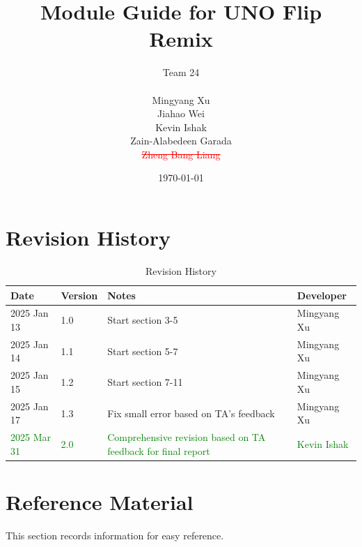 \documentclass[12pt, titlepage]{article}
\newcommand{\progname}{UNO Flip Remix}
\newcommand{\removed}[1]{\textcolor{red}{\sout{#1}}}
\newcommand{\added}[1]{\textcolor{green}{#1}}
\begin{document}
\title{Module Guide for \progname} 

\author{
\begin{tabular}{c}
Team 24\\
\\
Mingyang Xu \\
Jiahao Wei \\
Kevin Ishak \\
Zain-Alabedeen Garada \\
\removed{Zheng Bang Liang} \\
\end{tabular}
}

\date{\today}

\maketitle


\section{Revision History}

\begin{table}[H]
\centering
\begin{tabularx}{\textwidth}{p{3cm}p{2cm}p{6cm}p{3cm}}
\toprule
{\bf Date} & {\bf Version} & {\bf Notes} & {\bf Developer}\\
\midrule
2025 Jan 13 & 1.0 & Start section 3-5 & Mingyang Xu\\
2025 Jan 14 & 1.1 & Start section 5-7 & Mingyang Xu\\
2025 Jan 15 & 1.2 & Start section 7-11 & Mingyang Xu\\
2025 Jan 17 & 1.3 & Fix small error based on TA's feedback & Mingyang Xu\\
\added{2025 Mar 31} & \added{2.0} & \added{Comprehensive revision based on TA feedback for final report} & \added{Kevin Ishak} \\
\bottomrule
\end{tabularx}
\caption{Revision History}
\label{tab:revision_history}
\end{table}

\newpage

\section{Reference Material}

This section records information for easy reference.
\end{document}
